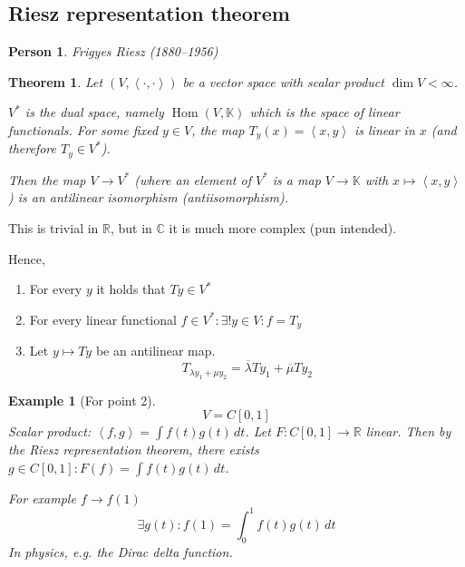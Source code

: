 \documentclass[a4paper]{article}
\newcounter{lecref}[section]
\numberwithin{lecref}{section}
\newtheorem{theorem}[lecref]{Theorem}
\newtheorem*{Example}{Example}
\newtheorem*{Person}{Person}
\newcommand{\ip}[2]{\left\langle#1,#2\right\rangle} %
\begin{document}
\subsection{Riesz representation theorem}

\begin{Person}
  Frigyes Riesz (1880--1956)
\end{Person}

\begin{theorem} %
  Let $(V, \ip{\cdot}{\cdot})$ be a vector space with scalar product $\dim{V} < \infty$.

  $V^*$ is the dual space, namely $\operatorname{Hom}(V, \mathbb K)$ which is the space of linear functionals.
  For some fixed $y \in V$, the map $T_y(x) = \ip{x}{y}$ is linear in $x$ (and therefore $T_y \in V^*$).

  Then the map $V \to V^*$ (where an element of $V^*$ is a map $V \to \mathbb K$ with $x \mapsto \ip xy$)
  is an antilinear isomorphism (antiisomorphism).
\end{theorem}

This is trivial in $\mathbb R$, but in $\mathbb C$ it is much more complex (pun intended).

Hence,
\begin{enumerate}
  \item For every $y$ it holds that $Ty \in V^*$
  \item For every linear functional $f \in V^*: \exists! y \in V: f = T_y$
  \item Let $y \mapsto Ty$ be an antilinear map.
    \[ T_{\lambda y_1 + \mu y_2} = \overline{\lambda} Ty_1 + \overline{\mu} Ty_2 \]
\end{enumerate}

\begin{Example}[For point 2]
  \[ V = C[0,1] \]
  Scalar product: $\ip fg = \int f(t) g(t) \, dt$.
  Let $F: C[0,1] \to \mathbb R$ linear.
  Then by the Riesz representation theorem,
  there exists $g \in C[0,1]: F(f) = \int f(t) g(t) \, dt$.

  For example $f \to f(1)$
  \[ \exists g(t): f(1) = \int_0^1 f(t) g(t) \, dt \]
  In physics, e.g. the Dirac delta function.
\end{Example}
\end{document}
